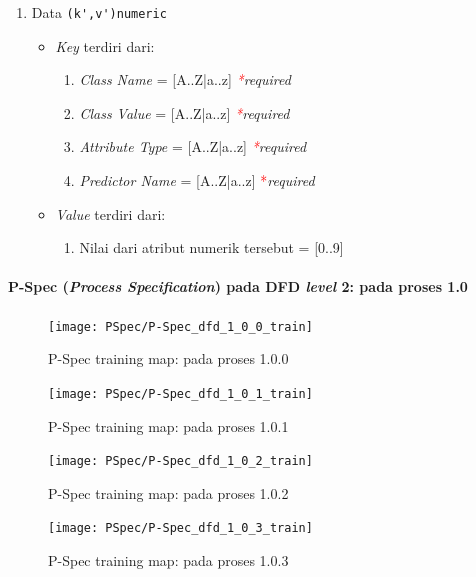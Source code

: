 \begin{enumerate}
	\item{Data \verb|(k',v')numeric|}
	\begin{itemize}
		\item \textit{Key} terdiri dari:
		\begin{enumerate}
			\item \textit{Class Name} = [A..Z|a..z] \textit{\textcolor{red}{*}required}
			\item \textit{Class Value} = [A..Z|a..z] \textit{\textcolor{red}{*}required}
			\item \textit{Attribute Type} = [A..Z|a..z] \textit{\textcolor{red}{*}required}
			\item \textit{Predictor Name} = [A..Z|a..z] \textcolor{red}{*}\textit{required}
		\end{enumerate}
		\item \textit{Value} terdiri dari:
		\begin{enumerate}
			\item Nilai dari atribut numerik tersebut = [0..9]
		\end{enumerate}
	\end{itemize}

\end{enumerate}

\paragraph{P-Spec (\textit{Process Specification}) pada DFD \textit{level} 2: pada proses 1.0}
\begin{figure}[H]
	\centering
	\texttt{[image: PSpec/P-Spec\_dfd\_1\_0\_0\_train]}
	\caption[P-Spec proses 1.0.0]{P-Spec training map: pada proses 1.0.0}
	\label{fig:P-Spec training: pada proses 1.0.0}
\end{figure}

\begin{figure}[H]
	\centering
	\texttt{[image: PSpec/P-Spec\_dfd\_1\_0\_1\_train]}
	\caption[P-Spec proses 1.0.1]{P-Spec training map: pada proses 1.0.1}
	\label{fig:P-Spec training: pada proses 1.0.1}
\end{figure}

\begin{figure}[H]
	\centering
	\texttt{[image: PSpec/P-Spec\_dfd\_1\_0\_2\_train]}
	\caption[P-Spec proses 1.0.2]{P-Spec training map: pada proses 1.0.2}
	\label{fig:P-Spec training: pada proses 1.0.2}
\end{figure}

\begin{figure}[H]
	\centering
	\texttt{[image: PSpec/P-Spec\_dfd\_1\_0\_3\_train]}
	\caption[P-Spec proses 1.0.3]{P-Spec training map: pada proses 1.0.3}
	\label{fig:P-Spec training: pada proses 1.0.3}
\end{figure}

